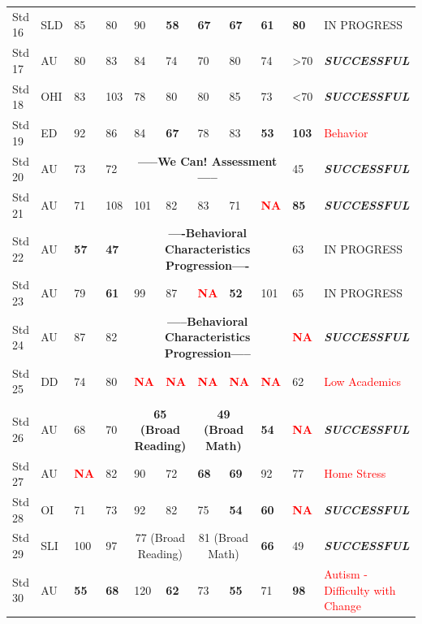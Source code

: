 \documentclass[twoside]{article}
\begin{document}
\begin{tiny}
\begin{landscape}
\begin{longtable}{p{1.5cm}p{1.5cm}p{1.5cm}p{1.5cm}p{1.75cm}p{1.75cm}p{1.75cm}p{1.75cm}p{1.75cm}p{1.75cm}p{2.5cm}@{}}
Std 16 & SLD &85 &80 & 90 & \textbf{58} & \textbf{67} & \textbf{67} & \textbf{61} & \textbf{80} & IN PROGRESS \\
Std 17 & AU & 80 & 83 & 84 & 74 & 70 & 80 & 74 & \textgreater70 & \textbf{\textit{SUCCESSFUL}}\\
Std 18 & OHI & 83 & 103 & 78 & 80 & 80 & 85 & 73 & \textless70 & \textbf{\textit{SUCCESSFUL}} \\
Std 19 & ED & 92 & 86 & 84 & \textbf{67} & 78 & 83 & \textbf{53} & \textbf{103} & \textcolor{red}{Behavior} \\
Std 20 & AU & 73 & 72 & \multicolumn{5}{c}{\textbf{-----We Can! Assessment-----}} & 45 & \textbf{\textit{SUCCESSFUL}}\\
Std 21 & AU & 71 & 108 & 101 & 82 & 83 & 71 & \textcolor{red}{\textbf{NA}} & \textbf{85} & \textbf{\textit{SUCCESSFUL}} \\
Std 22 & AU & \textbf{57} & \textbf{47} & \multicolumn{5}{c}{\textbf{----Behavioral Characteristics Progression----}} & 63 & IN PROGRESS \\
Std 23 & AU & 79 & \textbf{61} & 99 & 87 & \textcolor{red}{\textbf{NA}} & \textbf{52} & 101 & 65 & IN PROGRESS \\
Std 24 & AU & 87 & 82 & \multicolumn{5}{c}{\textbf{-----Behavioral Characteristics Progression-----}} & \textcolor{red}{\textbf{NA}} &\textbf{\textit{SUCCESSFUL}}\\
Std 25 & DD & 74 & 80 & \textcolor{red}{\textbf{NA}} & \textcolor{red}{\textbf{NA}} & \textcolor{red}{\textbf{NA}} & \textcolor{red}{\textbf{NA}} & \textcolor{red}{\textbf{NA}} & 62 & \textcolor{red}{Low Academics}\\
\hline\\
Std 26 & AU & 68 & 70 & \multicolumn{2}{c}{\textbf{65 (Broad Reading)}} & \multicolumn{2}{c}{\textbf{49 (Broad Math)}} & \textbf{54} & \textcolor{red}{\textbf{NA}} & \textbf{\textit{SUCCESSFUL}}\\
Std 27 & AU & \textcolor{red}{\textbf{NA}} & 82 & 90 & 72 & \textbf{68} & \textbf{69} & 92 & 77 & \textcolor{red}{Home Stress}\\
Std 28 & OI & 71 & 73 & 92 & 82 & 75 & \textbf{54} & \textbf{60} & \textcolor{red}{\textbf{NA}} & \textbf{\textit{SUCCESSFUL}} \\
Std 29 & SLI & 100 & 97 & \multicolumn{2}{c}{77 (Broad Reading)} & \multicolumn{2}{c}{81 (Broad Math)} & \textbf{66} & 49 & \textbf{\textit{SUCCESSFUL}} \\
Std 30 & AU & \textbf{55} & \textbf{68} & 120 & \textbf{62} & 73 & \textbf{55} & 71 & \textbf{98} & \textcolor{red}{Autism - Difficulty with Change}\\

\end{longtable}
\end{landscape}
\end{tiny}
\end{document}
